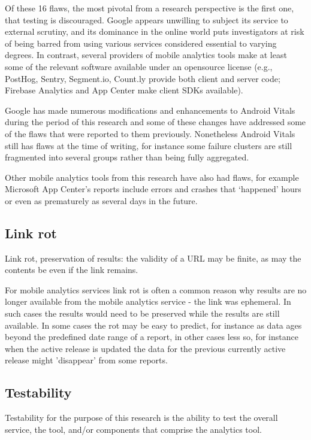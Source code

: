 Of these 16 flaws, the most pivotal from a research perspective is the first one, that testing is discouraged. Google appears unwilling to subject its service to external scrutiny, and its dominance in the online world puts investigators at risk of being barred from using various services considered essential to varying degrees. In contrast, several providers of mobile analytics tools make at least some of the relevant software available under an opensource license (e.g., PostHog, Sentry, Segment.io, Count.ly provide both client and server code; Firebase Analytics and App Center make client SDKs available). 

%
Google has made numerous modifications and enhancements to Android Vitals during the period of this research and some of these changes have addressed some of the flaws that were reported to them previously. Nonetheless Android Vitals still has flaws at the time of writing, for instance some failure clusters are still fragmented into several groups rather than being fully aggregated.

Other mobile analytics tools from this research have also had flaws, for example Microsoft App Center's reports include errors and crashes that `happened' hours or even as prematurely as several days in the future. 

\subsection{Link rot}
Link rot, preservation of results: the validity of a URL may be finite, as may the contents be even if the link remains. 

For mobile analytics services link rot is often a common reason why results are no longer available from the mobile analytics service - the link was ephemeral. In such cases the results would need to be preserved while the results are still available. In some cases the rot may be easy to predict, for instance as data ages beyond the predefined date range of a report, in other cases less so, for instance when the active release is updated the data for the previous currently active release might 'disappear' from some reports.

\subsection{Testability}
Testability for the purpose of this research is the ability to test the overall service, the tool, and/or components that comprise the analytics tool. 

